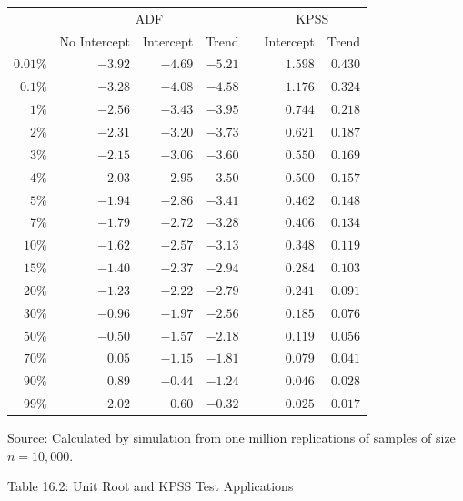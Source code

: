 \documentclass[10pt]{article}
\begin{document}
\begin{tabular}{rrrrrrr}
\hline\hline
 & \multicolumn{3}{c}{ADF} &  & \multicolumn{2}{c}{KPSS} \\
\cline { 2 - 4 }\cline { 7 - 8 }
 & No Intercept & Intercept & Trend &  & Intercept & Trend \\
\cline { 1 - 3 }\cline { 7 - 8 }
$0.01 \%$ & $-3.92$ & $-4.69$ & $-5.21$ &  & $1.598$ & $0.430$ \\
$0.1 \%$ & $-3.28$ & $-4.08$ & $-4.58$ &  & $1.176$ & $0.324$ \\
$1 \%$ & $-2.56$ & $-3.43$ & $-3.95$ &  & $0.744$ & $0.218$ \\
$2 \%$ & $-2.31$ & $-3.20$ & $-3.73$ &  & $0.621$ & $0.187$ \\
$3 \%$ & $-2.15$ & $-3.06$ & $-3.60$ &  & $0.550$ & $0.169$ \\
$4 \%$ & $-2.03$ & $-2.95$ & $-3.50$ &  & $0.500$ & $0.157$ \\
$5 \%$ & $-1.94$ & $-2.86$ & $-3.41$ &  & $0.462$ & $0.148$ \\
$7 \%$ & $-1.79$ & $-2.72$ & $-3.28$ &  & $0.406$ & $0.134$ \\
$10 \%$ & $-1.62$ & $-2.57$ & $-3.13$ &  & $0.348$ & $0.119$ \\
$15 \%$ & $-1.40$ & $-2.37$ & $-2.94$ &  & $0.284$ & $0.103$ \\
$20 \%$ & $-1.23$ & $-2.22$ & $-2.79$ &  & $0.241$ & $0.091$ \\
$30 \%$ & $-0.96$ & $-1.97$ & $-2.56$ &  & $0.185$ & $0.076$ \\
$50 \%$ & $-0.50$ & $-1.57$ & $-2.18$ &  & $0.119$ & $0.056$ \\
$70 \%$ & $0.05$ & $-1.15$ & $-1.81$ &  & $0.079$ & $0.041$ \\
$90 \%$ & $0.89$ & $-0.44$ & $-1.24$ &  & $0.046$ & $0.028$ \\
$99 \%$ & $2.02$ & $0.60$ & $-0.32$ &  & $0.025$ & $0.017$ \\
\hline
\end{tabular}

Source: Calculated by simulation from one million replications of samples of size $n=10,000$.

Table 16.2: Unit Root and KPSS Test Applications
\end{document}
